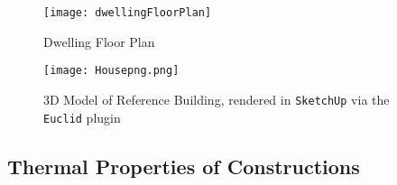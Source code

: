 \begin{figure}[htb]
    \centering
    \texttt{[image: dwellingFloorPlan]}
    \caption{Dwelling Floor Plan}
    \label{fig:floorplan}
\end{figure}

\begin{figure}[htb]
    \centering
    \texttt{[image: Housepng.png]}
    \caption[3D Model of Reference Building]{3D Model of Reference Building, rendered in \texttt{SketchUp} via the \texttt{Euclid} plugin}
    \label{fig:3dmodel}
\end{figure}


\subsection{Thermal Properties of Constructions}

